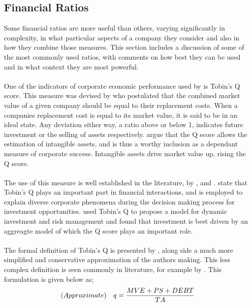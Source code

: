 \subsection{Financial Ratios}\label{FinancialRatios}
{Some financial ratios are more useful than others, varying significantly in complexity, in what particular aspects of a company they consider and also in how they combine those measures. This section includes a discussion of some of the most commonly used ratios, with comments on how best they can be used and in what context they are most powerful. \\\\
One of the indicators of corporate economic performance used by \cite{moldovan2015learning} is Tobin's Q score. This measure was devised by \cite{tobin1969general} who postulated that the combined market value of a given company should be equal to their replacement costs. When a companies replacement cost is equal to its market value, it is said to be in an ideal state. Any deviation either way, a ratio above or below 1, indicates future investment or the selling of assets respectively. \cite{moldovan2015learning} argue that the Q score allows the estimation of intangible assets, and is thus a worthy inclusion as a dependant measure of corporate success. Intangible assets drive market value up, rising the Q score.  \\\\
The use of this measure is well established in the literature, by \cite{chung1994simple}, 
\cite{bhagat2008corporate} and \cite{bolton2011unified}. \cite{chung1994simple} state that Tobin's Q plays an important part in financial interactions, and is employed to explain diverse corporate phenomena during the  decision making process for investment opportunities. \cite{bolton2011unified} used Tobin's Q to propose a model for dynamic investment and risk management and found that investment is best driven by an aggreagte model of which the Q score plays an important role. \\\\
The formal definition of Tobin's Q is presented by \cite{chung1994simple}, along side a much more simplified and conservative approximation of the authors making. This less complex definition is seen commonly in literature, for example by \cite{wahba2008does}. This formulation is given below as; \\
\begin {equation}\label{TobinQ}
(Approximate) \quad q  = \small {\frac{MVE + PS + DEBT}{TA}}
\end{equation}\\
}
